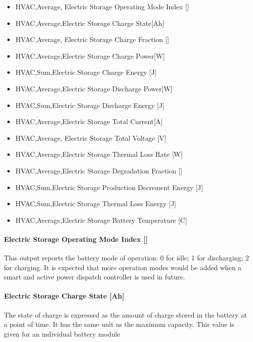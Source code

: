 \begin{itemize}
  \item
    HVAC,Average, Electric Storage Operating Mode Index {[]}
  \item
    HVAC,Average,Electric Storage Charge State{[}Ah{]}
  \item
    HVAC,Average, Electric Storage Charge Fraction {[]}
  \item
    HVAC,Average,Electric Storage Charge Power{[}W{]}
  \item
    HVAC,Sum,Electric Storage Charge Energy {[}J{]}
  \item
    HVAC,Average,Electric Storage Discharge Power{[}W{]}
  \item
    HVAC,Sum,Electric Storage Discharge Energy {[}J{]}
  \item
    HVAC,Average,Electric Storage Total Current{[}A{]}
  \item
    HVAC,Average, Electric Storage Total Voltage {[}V{]}
  \item
    HVAC,Average,Electric Storage Thermal Loss Rate {[}W{]}
  \item
    HVAC,Average,Electric Storage Degradation Fraction {[]}
  \item
    HVAC,Sum,Electric Storage Production Decrement Energy {[}J{]}
  \item
    HVAC,Sum,Electric Storage Thermal Loss Energy {[}J{]}
  \item
    HVAC,Average,Electric Storage Battery Temperature {[}C{]}
\end{itemize}

\paragraph{Electric Storage Operating Mode Index {[]}}\label{liion-operating-mode-index}

This output reports the battery mode of operation: 0 for idle; 1 for discharging; 2 for charging. It is expected that more operation modes would be added when a smart and active power dispatch controller is used in future.

\paragraph{Electric Storage Charge State {[}Ah{]}}\label{liion-charge-state-ah}

The state of charge is expressed as the amount of charge stored in the battery at a point of time. It has the same unit as the maximum capacity. This value is given for an individual battery module

